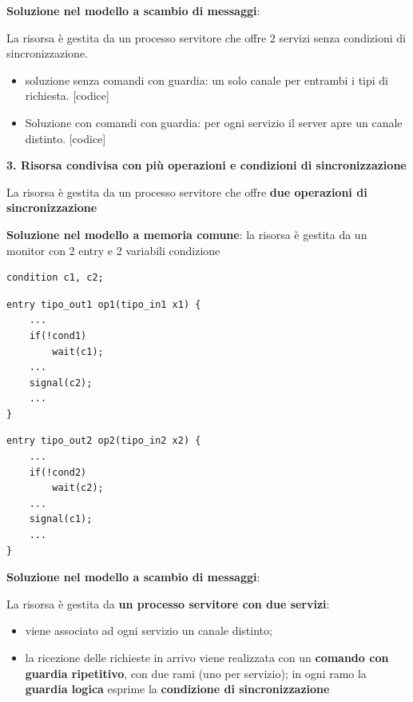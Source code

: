 \documentclass{article}
\begin{document}
\vspace{3mm}
\textbf{Soluzione nel modello a scambio di messaggi}:

La risorsa è gestita da un processo servitore che offre 2 servizi senza condizioni di sincronizzazione.

\begin{itemize}
    \item soluzione senza comandi con guardia: un solo canale per entrambi i tipi di richiesta. [codice]
    \item Soluzione con comandi con guardia: per ogni servizio il server apre un canale distinto. [codice]
\end{itemize}

\vspace{5mm}
{\large \textbf{3. Risorsa condivisa con più operazioni e condizioni di sincronizzazione}}

\vspace{3mm}
La risorsa è gestita da un processo servitore che offre \textbf{due operazioni di sincronizzazione}

\vspace{3mm}
\textbf{Soluzione nel modello a memoria comune}: la risorsa è gestita da un monitor con 2 entry e 2 variabili condizione

\begin{lstlisting}
condition c1, c2;
\end{lstlisting}
\noindent
\begin{minipage}{.45\columnwidth}
\begin{lstlisting}
entry tipo_out1 op1(tipo_in1 x1) {
    ...
    if(!cond1)
        wait(c1);
    ...
    signal(c2);
    ...
}
\end{lstlisting}
\end{minipage}\hfill
\begin{minipage}{.45\columnwidth}
\begin{lstlisting}
entry tipo_out2 op2(tipo_in2 x2) {
    ...
    if(!cond2)
        wait(c2);
    ...
    signal(c1);
    ...
}
\end{lstlisting}
\end{minipage}

\vspace{3mm}
\textbf{Soluzione nel modello a scambio di messaggi}:

La risorsa è gestita da \textbf{un processo servitore con due servizi}:
\begin{itemize}
    \item viene associato ad ogni servizio un canale distinto;
    \item la ricezione delle richieste in arrivo viene realizzata con un \textbf{comando con guardia ripetitivo}, con due rami (uno per servizio); in ogni ramo la
    \textbf{guardia logica} esprime la \textbf{condizione di sincronizzazione}
\end{itemize}
\end{document}
